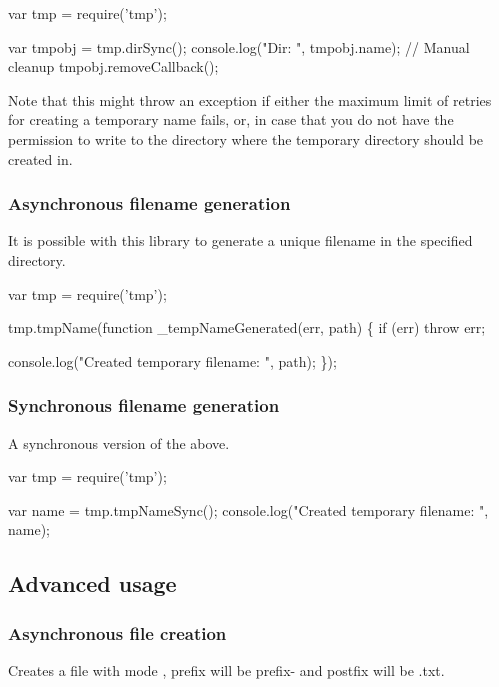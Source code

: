 \begin{DoxyCode}
var tmp = require('tmp');

var tmpobj = tmp.dirSync();
console.log("Dir: ", tmpobj.name);
// Manual cleanup
tmpobj.removeCallback();
\end{DoxyCode}


Note that this might throw an exception if either the maximum limit of retries for creating a temporary name fails, or, in case that you do not have the permission to write to the directory where the temporary directory should be created in.

\subsubsection*{Asynchronous filename generation}

It is possible with this library to generate a unique filename in the specified directory.


\begin{DoxyCode}
var tmp = require('tmp');

tmp.tmpName(function \_tempNameGenerated(err, path) \{
    if (err) throw err;

    console.log("Created temporary filename: ", path);
\});
\end{DoxyCode}


\subsubsection*{Synchronous filename generation}

A synchronous version of the above.


\begin{DoxyCode}
var tmp = require('tmp');

var name = tmp.tmpNameSync();
console.log("Created temporary filename: ", name);
\end{DoxyCode}


\subsection*{Advanced usage}

\subsubsection*{Asynchronous file creation}

Creates a file with mode {}, prefix will be {\ttfamily prefix-\/} and postfix will be {\ttfamily .txt}.


